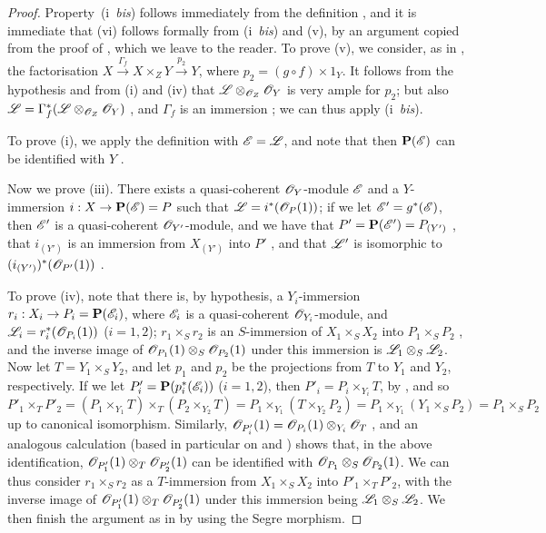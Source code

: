 \begin{proof}
Property~(i~\emph{bis}) follows immediately from the definition , and it is immediate that (vi) follows formally from (i~\emph{bis}) and (v), by an argument copied from the proof of , which we leave to the reader.
To prove (v), we consider, as in , the factorisation $X\xrightarrow{\Gamma_f}X\times_Z Y\xrightarrow{p_2}Y$, where $p_2=(g\circ f)\times1_Y$.
It follows from the hypothesis and from (i) and (iv) that $\mathscr{L}\otimes_{\mathscr{O}_Z}\mathscr{O}_Y$ is very ample for $p_2$;
but also $\mathscr{L}=\Gamma_f^*(\mathscr{L}\otimes_{\mathscr{O}_Z}\mathscr{O}_Y)$ , and $\Gamma_f$ is an immersion ;
we can thus apply (i~\emph{bis}).

To prove (i), we apply the definition  with $\mathscr{E}=\mathscr{L}$, and note that then $\mathbf{P}(\mathscr{E})$ can be identified with $Y$ .

Now we prove (iii).
There exists a quasi-coherent $\mathscr{O}_Y$-module $\mathscr{E}$ and a $Y$-immersion $i:X\to\bb{P}(\sh{E})=P$ such that $\mathscr{L}=i^*(\mathscr{O}_P(1))$;
if we let $\mathscr{E}'=g^*(\mathscr{E})$, then $\mathscr{E}'$ is a quasi-coherent $\mathscr{O}_{Y'}$-module, and we have that $P'=\mathbf{P}(\mathscr{E}')=P_{(Y')}$ , that $i_{(Y')}$ is an immersion from $X_{(Y')}$ into $P'$ , and that $\mathscr{L}'$ is isomorphic to $(i_{(Y')})^*(\mathscr{O}_{P'}(1))$ .

To prove (iv), note that there is, by hypothesis, a $Y_i$-immersion $r_i:X_i\to P_i=\bb{P}(\sh{E}_i)$, where $\mathscr{E}_i$ is a quasi-coherent $\mathscr{O}_{Y_i}$-module, and $\mathscr{L}_i=r_i^*(\mathscr{O}_{P_i}(1))$ ($i=1,2$);
$r_1\times_S r_2$ is an $S$-immersion of $X_1\times_S X_2$ into $P_1\times_S P_2$ , and the inverse image of $\mathscr{O}_{P_1}(1)\otimes_S\mathscr{O}_{P_2}(1)$ under this immersion is $\mathscr{L}_1\otimes_S\mathscr{L}_2$.
Now let $T=Y_1\times_S Y_2$, and let $p_1$ and $p_2$ be the projections from $T$ to $Y_1$ and $Y_2$, respectively.
If we let $P'_i=\mathbf{P}(p_i^*(\mathscr{E}_i))$ ($i=1,2$), then $P'_i=P_i\times_{Y_i}T$, by , and so
\[
  P'_1\times_T P'_2
  = (P_1\times_{Y_1}T)\times_T(P_2\times_{Y_2}T)
  = P_1\times_{Y_1}(T\times_{Y_2}P_2)
  = P_1\times_{Y_1}(Y_1\times_S P_2)
  = P_1\times_S P_2
\]
up to canonical isomorphism.
Similarly, $\mathscr{O}_{P'_i}(1)=\mathscr{O}_{P_i}(1)\otimes_{Y_i}\mathscr{O}_T$ , and an analogous calculation (based in particular on  and ) shows that, in the above identification, $\mathscr{O}_{P'_1}(1)\otimes_T\mathscr{O}_{P'_2}(1)$ can be identified with $\mathscr{O}_{P_1}\otimes_S\mathscr{O}_{P_2}(1)$.
We can thus consider $r_1\times_S r_2$ as a $T$-immersion from $X_1\times_S X_2$ into $P'_1\times_T P'_2$, with the inverse image of $\mathscr{O}_{P'_1}(1)\otimes_T\mathscr{O}_{P'_2}(1)$ under this immersion being $\mathscr{L}_1\otimes_S\mathscr{L}_2$.
We then finish the argument as in  by using the Segre morphism.


\end{proof}
